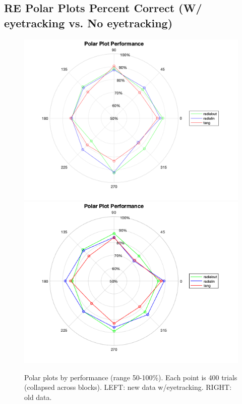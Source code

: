 \documentclass[11pt]{article} %
\begin{document}
\subsection{RE Polar Plots Percent Correct (W/ eyetracking vs. No eyetracking)}
\begin{figure}[H]
\centering %
\includegraphics[scale=.18]{Images/polarplot_new.png}
\includegraphics[scale=.35]{Images/performance_polarplot.png}
\caption{Polar plots by performance (range 50-100\%). Each point is 400 trials (collapsed across blocks). LEFT: new data w/eyetracking. RIGHT: old data.}
\end{figure}
\end{document}
